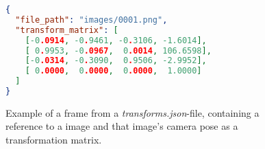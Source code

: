 \begin{figure}[ht]
\centering
\begin{lstlisting}[language=json,linewidth=0.9\linewidth]
{
  "file_path": "images/0001.png",
  "transform_matrix": [
    [-0.0914, -0.9461, -0.3106, -1.6014],
    [ 0.9953, -0.0967,  0.0014, 106.6598],
    [-0.0314, -0.3090,  0.9506, -2.9952],
    [ 0.0000,  0.0000,  0.0000,  1.0000]
  ]
}
\end{lstlisting}
\caption{Example of a frame from a \textit{transforms.json}-file, containing a reference to a image and that image's camera pose as a transformation matrix.}
\label{code:frame-example}
\end{figure}

